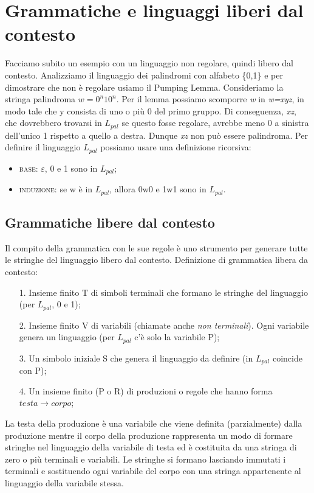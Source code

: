 \chapter{Grammatiche e linguaggi liberi dal contesto}
Facciamo subito un esempio con un linguaggio non regolare, quindi libero dal contesto.
Analizziamo il linguaggio dei palindromi con alfabeto \{0,1\} e per dimostrare che non 
è regolare usiamo il Pumping Lemma.
Consideriamo la stringa palindroma $w=0^{n}10^{n}$. Per il lemma possiamo scomporre
\textit{w} in \textit{w=xyz}, in modo tale che y consista di uno o più 0 del primo
gruppo. Di conseguenza, \textit{xz}, che dovrebbero trovarsi in $L_{pal}$ se questo 
fosse regolare, avrebbe meno 0 a sinistra dell'unico 1 rispetto a quello a destra.
Dunque \textit{xz} non può essere palindroma. 
Per definire il linguaggio $L_{pal}$ possiamo usare una definizione ricorsiva:
\begin{itemize}
\item \textsc{base}: $\varepsilon$, 0 e 1 sono in $L_{pal}$;
\item \textsc{induzione}: se w è in $L_{pal}$, allora 0w0 e 1w1 sono in $L_{pal}$.
\end{itemize}

\section{Grammatiche libere dal contesto}
Il compito della grammatica con le sue regole è uno strumento per generare tutte le
stringhe del linguaggio libero dal contesto.
Definizione di grammatica libera da contesto:
\begin{itemize}
\item[1.] Insieme finito T di simboli terminali che formano le stringhe del linguaggio
(per $L_{pal}$, 0 e 1);
\item[2.] Insieme finito V di variabili (chiamate anche \textit{non terminali}). Ogni
variabile genera un linguaggio (per $L_{pal}$ c'è solo la variabile P);
\item[3.] Un simbolo iniziale S che genera il linguaggio da definire (in $L_{pal}$
coincide con P);
\item[4.] Un insieme finito (P o R) di produzioni o regole che hanno forma 
\textbf{$testa \rightarrow corpo$};
\end{itemize}

La testa della produzione è una variabile che viene definita (parzialmente) 
dalla produzione mentre il corpo della produzione rappresenta un modo di formare 
stringhe nel linguaggio della variabile di testa ed è costituita da una stringa di
zero o più terminali e variabili. Le stringhe si formano lasciando immutati i 
terminali e sostituendo ogni variabile del corpo con una stringa appartenente al
linguaggio della variabile stessa.
\vspace{0.5cm}

